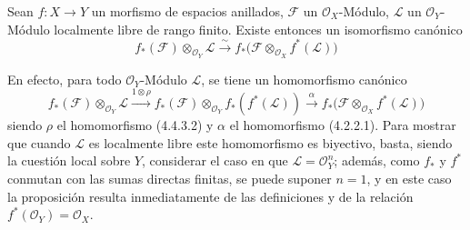 \begin{env}[5.4.10]
\label{0.5.4.10-fr}
Sean $f:X\to Y$ un morfismo de espacios anillados, $\mathcal{F}$ un
$\mathcal{O}_X$-Módulo, $\mathcal{L}$ un $\mathcal{O}_Y$-Módulo localmente
libre de rango finito. Existe entonces un isomorfismo canónico
\[
  f_*(\mathcal{F})\otimes_{\mathcal{O}_Y}\mathcal{L}
  \xrightarrow{\sim}
  f_*\bigl(\mathcal{F}\otimes_{\mathcal{O}_X}f^*(\mathcal{L})\bigr)
  \tag{5.4.10.1}\label{0.5.4.10.1-fr}
\]


En efecto, para todo $\mathcal{O}_Y$-Módulo $\mathcal{L}$, se tiene un
homomorfismo canónico
\[
  f_*(\mathcal{F})\otimes_{\mathcal{O}_Y}\mathcal{L}
  \xrightarrow{1\otimes\rho}
  f_*(\mathcal{F})\otimes_{\mathcal{O}_Y}f_*(f^*(\mathcal{L}))
  \xrightarrow{\alpha}
  f_*\bigl(\mathcal{F}\otimes_{\mathcal{O}_X}f^*(\mathcal{L})\bigr)
\]
siendo $\rho$ el homomorfismo (4.4.3.2) y $\alpha$ el homomorfismo (4.2.2.1).
Para mostrar que cuando $\mathcal{L}$ es localmente libre este homomorfismo
es biyectivo, basta, siendo la cuestión local sobre $Y$, considerar el
caso en que $\mathcal{L}=\mathcal{O}_Y^n$; además, como $f_*$ y $f^*$ conmutan con las
sumas directas finitas, se puede suponer $n=1$, y en este caso la proposición
resulta inmediatamente de las definiciones y de la relación
$f^*(\mathcal{O}_Y)=\mathcal{O}_X$.
\end{env}


